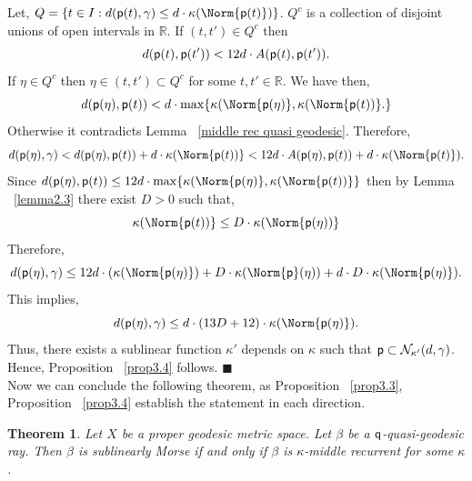 \documentclass[12 pt]{amsart}
\newcommand{\calN}{\mathcal{N}}
\newtheorem{theorem}{Theorem}[section]
\theoremstyle{definition}
\theoremstyle{remark}
\newcommand{\pp}{{\sf p}}
\newcommand{\qq}{{\sf q}}
\begin{document}
Let, $Q =\{t\in I:d(\pp(t), \gamma) \leq d \cdot \kappa(\Norm{\pp(t)})\}$. $Q^c$ is a collection of disjoint unions of open intervals in $\mathbb{R}$. If $(t,t') \in Q^c$ then \[d (\pp(t),\pp(t')) < 12d \cdot A(\pp(t),\pp(t')).\] If $\eta \in Q^c$ then $\eta \in (t,t')\subset Q^c$ for some $t,t' \in \mathbb{R}$. We have then,
 \[d(\pp(\eta), \pp(t))< d \cdot  \max \{ \kappa(\Norm {\pp(\eta)}, \kappa(\Norm{\pp(t))}.\} \]
 Otherwise it contradicts Lemma ~\ref{middle rec quasi geodesic}.
 Therefore, \[d(\pp(\eta),\gamma) < d(\pp(\eta), \pp(t))+ d \cdot \kappa(\Norm{\pp(t))} < 12d \cdot  A(\pp(\eta), \pp(t))+d \cdot \kappa(\Norm{\pp(t)}).\]
 Since $ d(\pp(\eta), \pp(t)) \leq 12d \cdot \max \{ \kappa(\Norm {\pp(\eta)}, \kappa(\Norm{\pp(t))}\}$ then by Lemma ~\ref{lemma2.3} 
 there exist $D >0$ such that, 
 $$\kappa(\Norm {\pp(t))} \le D \cdot \kappa(\Norm{\pp(\eta))}$$ 
Therefore, \[d(\pp(\eta),\gamma) \leq 12d\cdot (\kappa(\Norm {\pp(\eta)})+D\cdot \kappa(\Norm \pp(\eta))+ d \cdot D\cdot \kappa(\Norm {\pp(\eta)}).\]
This implies, \[d(\pp(\eta),\gamma) \leq d \cdot (13 D+12) \cdot  \kappa(\Norm {\pp(\eta)}).\]
Thus, there exists a sublinear function $\kappa'$ depends on $\kappa$ such that $\pp \subset \calN_{\kappa'}(d, \gamma)$. Hence, Proposition ~\ref{prop3.4} follows.
\hfill $\blacksquare$\\
Now we can conclude the following theorem, as Proposition ~\ref{prop3.3}, Proposition ~\ref{prop3.4} establish the statement in each direction.
\begin{theorem}
Let $X$ be a proper geodesic metric space. Let $\beta$ be a $\qq$-quasi-geodesic ray. Then $\beta$ is sublinearly Morse if and only if $\beta$ is $\kappa$-middle recurrent for some $\kappa$.
\end{theorem}
\end{document}
